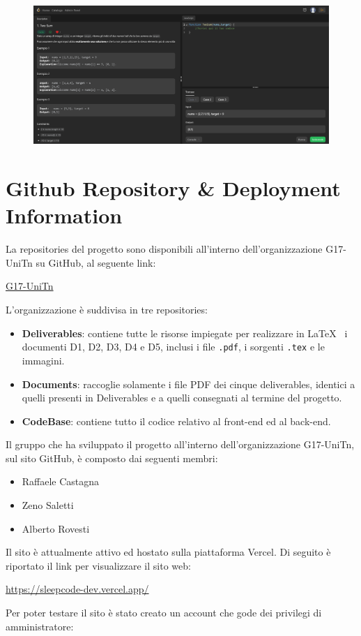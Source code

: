 \documentclass[11pt, a4paper]{article}
\theoremstyle{definition}
\begin{document}
\begin{figure}[H]
  \centering
  \includegraphics[width=\textwidth]{materiale/sito/Problema.png}
\end{figure}

\newpage
\section{Github Repository \& Deployment Information}
La repositories del progetto sono disponibili all'interno dell'organizzazione
G17-UniTn su GitHub, al seguente link:
\begin{center}
  \href{https://github.com/G17-UniTn}{G17-UniTn}
\end{center}
L'organizzazione è suddivisa in tre repositories:
\begin{itemize}
  \item \textbf{Deliverables}: contiene tutte le risorse impiegate per realizzare in \LaTeX\texttt{ } i documenti D1, D2, D3, D4 e D5, inclusi i file \texttt{.pdf}, i sorgenti \texttt{.tex} e le immagini.
  \item \textbf{Documents}: raccoglie solamente i file PDF dei cinque deliverables, identici a quelli presenti in Deliverables e a quelli consegnati al termine del progetto.
  \item \textbf{CodeBase}: contiene tutto il codice relativo al front-end ed al back-end.
\end{itemize}
Il gruppo che ha sviluppato il progetto all'interno dell'organizzazione G17-UniTn, sul sito GitHub, è composto dai seguenti membri:
\begin{itemize}
  \item Raffaele Castagna \href{https://github.com/Raffaele-Castagna}{\faGithub}
  \item Zeno Saletti \href{https://github.com/zenosalty}{\faGithub}
  \item Alberto Rovesti \href{https://github.com/uniBeto}{\faGithub}
\end{itemize}
Il sito è attualmente attivo ed hostato sulla piattaforma Vercel. Di seguito è riportato il link per visualizzare il sito web:
\begin{center}
  \url{https://sleepcode-dev.vercel.app/}
\end{center}
Per poter testare il sito è stato creato un account che gode dei privilegi di amministratore:
\end{document}
